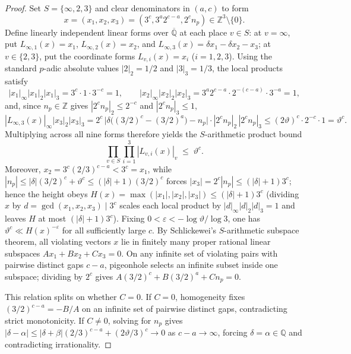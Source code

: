 \documentclass[11pt,a4paper]{article}
\theoremstyle{remark}
\newcommand{\Q}{\mathbb{Q}}
\newcommand{\Z}{\mathbb{Z}}
\begin{document}
\begin{proof}
Set $S = \{\infty, 2, 3\}$ and clear denominators in $(a,c)$ to form
\[
  x = (x_{1},x_{2},x_{3}) = (3^{c}, 3^{a} 2^{c-a}, 2^{c} n_{p}) \in \Z^{3} \setminus \{0\}.
\]
Define linearly independent linear forms over $\overline{\Q}$ at each place $v \in S$: at $v = \infty$, put $L_{\infty,1}(x) = x_{1}$, $L_{\infty,2}(x) = x_{2}$, and $L_{\infty,3}(x) = \delta x_{1} - \delta x_{2} - x_{3}$; at $v \in \{2,3\}$, put the coordinate forms $L_{v,i}(x) = x_{i}$ ($i = 1,2,3$). Using the standard $p$-adic absolute values $|2|_{2} = 1/2$ and $|3|_{3} = 1/3$, the local products satisfy
\[
  |x_{1}|_{\infty} |x_{1}|_{2} |x_{1}|_{3} = 3^{c} \cdot 1 \cdot 3^{-c} = 1,
  \qquad
  |x_{2}|_{\infty} |x_{2}|_{2} |x_{2}|_{3} = 3^{a} 2^{c-a} \cdot 2^{-(c-a)} \cdot 3^{-a} = 1,
\]
and, since $n_{p} \in \Z$ gives $|2^{c} n_{p}|_{2} \le 2^{-c}$ and $|2^{c} n_{p}|_{3} \le 1$,
\[
  |L_{\infty,3}(x)|_{\infty} |x_{3}|_{2} |x_{3}|_{3}
  = 2^{c}\,\bigl|\delta\bigl((3/2)^{c} - (3/2)^{a}\bigr) - n_{p}\bigr|\cdot |2^{c} n_{p}|_{2}\, |2^{c} n_{p}|_{3}
  \le (2\vartheta)^{c} \cdot 2^{-c} \cdot 1 = \vartheta^{c}.
\]
Multiplying across all nine forms therefore yields the $S$-arithmetic product bound
\[
  \prod_{v \in S} \prod_{i=1}^{3} |L_{v,i}(x)|_{v} \;\le\; \vartheta^{c}.
\]
Moreover, $x_{2} = 3^{c}(2/3)^{c-a} < 3^{c} = x_{1}$, while $|n_{p}| \le |\delta|(3/2)^{c} + \vartheta^{c} \le (|\delta| + 1)(3/2)^{c}$ forces $|x_{3}| = 2^{c}|n_{p}| \le (|\delta| + 1)3^{c}$; hence the height obeys $H(x) = \max(|x_{1}|,|x_{2}|,|x_{3}|) \le (|\delta| + 1)3^{c}$ (dividing $x$ by $d = \gcd(x_{1},x_{2},x_{3}) \mid 3^{c}$ scales each local product by $|d|_{\infty}|d|_{2}|d|_{3} = 1$ and leaves $H$ at most $(|\delta|+1)3^{c}$). Fixing $0 < \varepsilon < -\log\vartheta / \log 3$, one has $\vartheta^{c} \ll H(x)^{-\varepsilon}$ for all sufficiently large $c$. By Schlickewei's $S$-arithmetic subspace theorem, all violating vectors $x$ lie in finitely many proper rational linear subspaces $A x_{1} + B x_{2} + C x_{3} = 0$. On any infinite set of violating pairs with pairwise distinct gaps $c - a$, pigeonhole selects an infinite subset inside one subspace; dividing by $2^{c}$ gives $A(3/2)^{c} + B(3/2)^{a} + C n_{p} = 0$.

This relation splits on whether $C = 0$. If $C = 0$, homogeneity fixes $(3/2)^{c-a} = -B/A$ on an infinite set of pairwise distinct gaps, contradicting strict monotonicity. If $C \neq 0$, solving for $n_{p}$ gives $|\delta - \alpha| \le |\delta + \beta|(2/3)^{c-a} + (2\vartheta/3)^{c} \to 0$ as $c - a \to \infty$, forcing $\delta = \alpha \in \Q$ and contradicting irrationality.
\end{proof}
\end{document}
